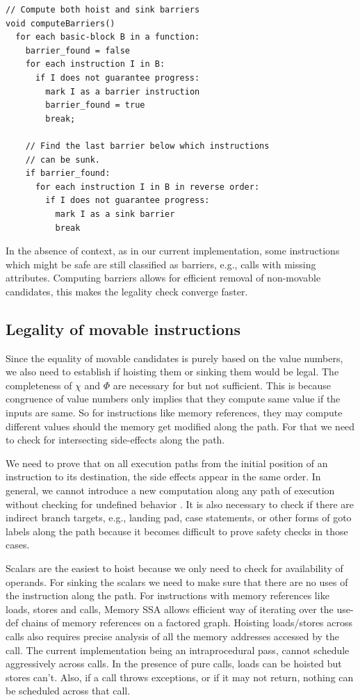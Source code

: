 \documentclass[sigplan,10pt,review,anonymous]{acmart}\settopmatter{printfolios=true,printccs=false,printacmref=false}
\begin{document}
\begin{lstlisting}
// Compute both hoist and sink barriers
void computeBarriers()
  for each basic-block B in a function:
    barrier_found = false
    for each instruction I in B:
      if I does not guarantee progress:
        mark I as a barrier instruction
        barrier_found = true
        break;

    // Find the last barrier below which instructions
    // can be sunk.
    if barrier_found:
      for each instruction I in B in reverse order:
        if I does not guarantee progress:
          mark I as a sink barrier
          break
\end{lstlisting}


In the absence of context, as in our current implementation, some instructions
which might be safe are still classified as barriers, e.g., calls with missing
attributes.  Computing barriers allows for efficient removal of non-movable
candidates, this makes the legality check converge faster.

\subsection{Legality of movable instructions}
\label{subsec:legality}
Since the equality of movable candidates is purely based on the value numbers,
we also need to establish if hoisting them or sinking them would be legal. The
completeness of $\chi$ and $\Phi$ are necessary for \GCM{} but not
sufficient. This is because congruence of value numbers only implies that they
compute same value if the inputs are same. So for instructions like memory
references, they may compute different values should the memory get modified
along the path. For that we need to check for intersecting side-effects along
the path.

We need to prove that on all execution paths from the initial position of an
instruction to its destination, the side effects appear in the same order. In
general, we cannot introduce a new computation along any path of execution
without checking for undefined behavior \cite{undef}. It is also necessary to
check if there are indirect branch targets, e.g., landing pad, case statements,
or other forms of goto labels along the path because it becomes difficult to
prove safety checks in those cases.

Scalars are the easiest to hoist because we only need to check for availability
of operands. For sinking the scalars we need to make sure that there are no uses
of the instruction along the path. For instructions with memory references like
loads, stores and calls, Memory SSA allows efficient way of iterating over the
use-def chains of memory references on a factored graph. Hoisting loads/stores
across calls also requires precise analysis of all the memory addresses accessed
by the call. The current implementation being an intraprocedural pass, cannot
schedule aggressively across calls. In the presence of pure calls, loads can be
hoisted but stores can't. Also, if a call throws exceptions, or if it may not
return, nothing can be scheduled across that call.
\end{document}
